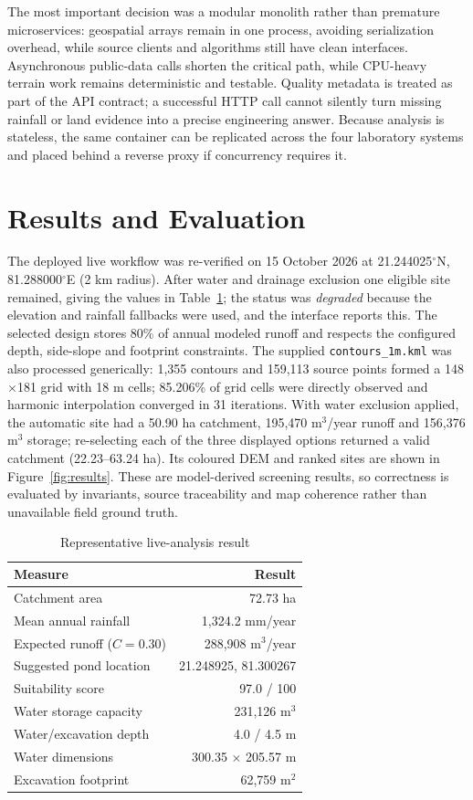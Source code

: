 \documentclass[manuscript,screen,review]{acmart}
\begin{document}
The most important decision was a modular monolith rather than premature microservices: geospatial arrays remain in one process, avoiding serialization overhead, while source clients and algorithms still have clean interfaces. Asynchronous public-data calls shorten the critical path, while CPU-heavy terrain work remains deterministic and testable. Quality metadata is treated as part of the API contract; a successful HTTP call cannot silently turn missing rainfall or land evidence into a precise engineering answer. Because analysis is stateless, the same container can be replicated across the four laboratory systems and placed behind a reverse proxy if concurrency requires it.

\section{Results and Evaluation}
The deployed live workflow was re-verified on 15 October 2026 at 21.244025$^\circ$N, 81.288000$^\circ$E (2 km radius). After water and drainage exclusion one eligible site remained, giving the values in Table~\ref{tab:results}; the status was \emph{degraded} because the elevation and rainfall fallbacks were used, and the interface reports this. The selected design stores 80\% of annual modeled runoff and respects the configured depth, side-slope and footprint constraints. The supplied \texttt{contours\_1m.kml} was also processed generically: 1,355 contours and 159,113 source points formed a 148$\times$181 grid with 18 m cells; 85.206\% of grid cells were directly observed and harmonic interpolation converged in 31 iterations. With water exclusion applied, the automatic site had a 50.90 ha catchment, 195,470 m$^3$/year runoff and 156,376 m$^3$ storage; re-selecting each of the three displayed options returned a valid catchment (22.23--63.24 ha). Its coloured DEM and ranked sites are shown in Figure~\ref{fig:results}. These are model-derived screening results, so correctness is evaluated by invariants, source traceability and map coherence rather than unavailable field ground truth.

\begin{table}[h]
  \caption{Representative live-analysis result}
  \label{tab:results}
  \begin{tabular}{p{4.4cm}r}
    \toprule
    Measure & Result \\
    \midrule
    Catchment area & 72.73 ha \\
    Mean annual rainfall & 1,324.2 mm/year \\
    Expected runoff ($C=0.30$) & 288,908 m$^3$/year \\
    Suggested pond location & 21.248925, 81.300267 \\
    Suitability score & 97.0 / 100 \\
    Water storage capacity & 231,126 m$^3$ \\
    Water/excavation depth & 4.0 / 4.5 m \\
    Water dimensions & 300.35 $\times$ 205.57 m \\
    Excavation footprint & 62,759 m$^2$ \\
    \bottomrule
  \end{tabular}
\end{table}
\end{document}
